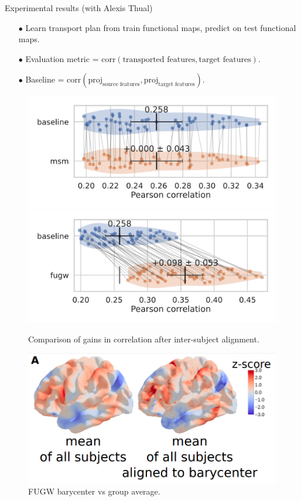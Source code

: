 \documentclass{beamer}
\begin{document}
\begin{frame}{Experimental results (with Alexis Thual)}
\scriptsize
\begin{itemize}
  \item[$\bullet$] Learn transport plan from train functional maps, predict on test functional maps.
  \item[$\bullet$] Evaluation metric = $\text{corr}(\text{transported features}, \text{target features})$.
  \item[$\bullet$] Baseline = $\text{corr}(\text{proj}_{\text{source features}}, \text{proj}_{\text{target features}})$.
\end{itemize}
\begin{figure}
  \centering
  \includegraphics[width=0.49\linewidth, keepaspectratio=true]{OT_new/fsaverage5_alignment_correlation_gain_msm.pdf}
  \includegraphics[width=0.49\linewidth, keepaspectratio=true]{OT_new/fsaverage5_alignment_correlation_gain_fugw.pdf}
  \caption*{\scriptsize{Comparison of gains in correlation after inter-subject alignment.}}
\end{figure}

\vspace{-0.2cm}
\begin{figure}
  \centering
  \includegraphics[width=0.4\linewidth, keepaspectratio=true]{OT_new/brain_template.png}
  \caption*{\scriptsize{FUGW barycenter vs group average.}}
\end{figure}


\end{frame}
\end{document}
